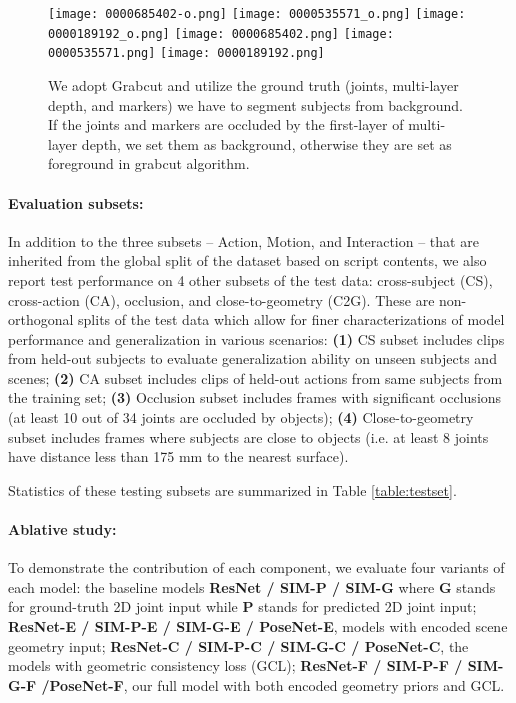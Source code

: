 \documentclass[times,referee,twocolumn,final,authoryear]{elsarticle}
\begin{document}
\begin{figure}[t]
\centering
\texttt{[image: 0000685402-o.png]}
\texttt{[image: 0000535571\_o.png]}
\texttt{[image: 0000189192\_o.png]}
\texttt{[image: 0000685402.png]}
\texttt{[image: 0000535571.png]}
\texttt{[image: 0000189192.png]}
\caption{We adopt Grabcut \cite{grabcut} and utilize the ground truth (joints, multi-layer depth, and markers) we have to segment subjects from background. If the joints and markers are occluded by the first-layer of multi-layer depth, we set them as background, otherwise they are set as foreground in grabcut algorithm. }
\label{fig:greenbackground}
\end{figure}


\paragraph{Evaluation subsets:} In addition to the three subsets --
Action, Motion, and Interaction -- that are inherited from the global split of the dataset
based on script contents, we also report test performance on 4 other subsets of the
test data: cross-subject (CS), cross-action (CA), occlusion, and close-to-geometry (C2G).
These are non-orthogonal splits of the test data which allow for finer characterizations 
of model performance and generalization in various scenarios:
\textbf{(1)} CS subset includes clips from held-out subjects to evaluate
generalization ability on unseen subjects and scenes; \textbf{(2)} CA subset includes
clips of held-out actions from same subjects from the training set;
\textbf{(3)} Occlusion subset includes frames with significant occlusions (at
least 10 out of 34 joints are occluded by objects); \textbf{(4)} Close-to-geometry
subset includes frames where subjects are close to objects (i.e. at least 8
joints have distance less than 175 mm to the nearest surface).

Statistics of these testing subsets are summarized in Table \ref{table:testset}.


\paragraph{Ablative study:} To demonstrate the contribution of each component, we
evaluate four variants of each model: the baseline models \textbf{ResNet / SIM-P / SIM-G} 
where \textbf{G} stands for ground-truth 2D joint input while \textbf{P} stands for predicted
2D joint input;
\textbf{ResNet-E / SIM-P-E / SIM-G-E / PoseNet-E}, models with encoded scene geometry
input; \textbf{ResNet-C / SIM-P-C / SIM-G-C / PoseNet-C}, the models with geometric consistency loss (GCL); \textbf{ResNet-F / SIM-P-F / SIM-G-F /PoseNet-F}, our full model
with both encoded geometry priors and GCL.
\end{document}
